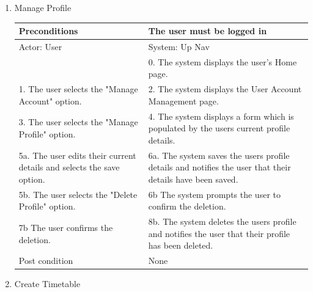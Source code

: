 \documentclass{article}
\begin{document}
\begin{enumerate}
\begin{center}
\begin{enumerate}
\begin{enumerate}
	\item{Manage Profile}

	\begin{table}[H]
	\centering
		\begin{tabular}{ | p{15em} | p{15em}| }
		\hline
		Preconditions                                                       						& The user must be logged in \\ 				
		\hline
		Actor: User                                                       							& System: Up Nav \\ 			
		\hline
                                                                  									& 0. The system displays the user's Home page. \\                                                           
		 \hline
		1. The user selects the "Manage Account" option.						& 2. The system displays the User Account Management page. \\
		 \hline
		3. The user selects the "Manage Profile" option. 						& 4.  The system displays a form which is populated by the users current profile details. \\
		\hline
		5a. The user edits their current details and selects the save option. 			& 6a. The system saves the users profile details and notifies the user that their details have been saved. \\ 
		\hline
		5b. The user selects the "Delete Profile" option.						& 6b The system prompts the user to confirm the deletion. \\
		\hline
		7b The user confirms the deletion.								& 8b. The system deletes the users profile and notifies the user that their profile has been deleted. \\
		\hline
		Post condition                                                     						& None \\ 			
		\hline
		\end{tabular}
	\end{table}

	\item{Create Timetable}


\end{enumerate}
\end{enumerate}
\end{center}
\end{enumerate}
\end{document}
